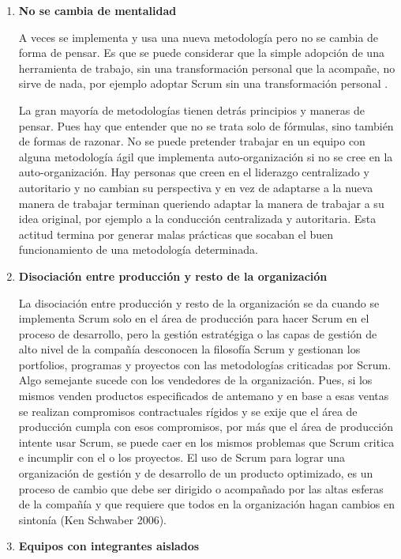 \begin{enumerate}
\item \textbf{No se cambia de mentalidad}

A veces se implementa y usa una nueva metodología pero no se cambia de forma de pensar. Es que se puede considerar que la simple adopción de una herramienta de trabajo, sin una transformación personal que la acompañe, no sirve de nada, por ejemplo adoptar Scrum sin una transformación personal \cite{Martin-Alaimo-Kleer-2014}. 

La gran mayoría de metodologías tienen detrás principios y maneras de pensar. Pues hay que entender que no se trata solo de fórmulas, sino también de formas de razonar. No se puede pretender trabajar en un equipo con alguna metodología ágil que implementa auto-organización si no se cree en la auto-organización. Hay personas que creen en el liderazgo centralizado y autoritario y no cambian su perspectiva y en vez de adaptarse a la nueva manera de trabajar terminan queriendo adaptar la manera de trabajar a su idea original, por ejemplo a la conducción centralizada y autoritaria. Esta actitud termina por generar malas prácticas que socaban el buen funcionamiento de una metodología determinada.

\item \textbf{Disociación entre producción y resto de la organización}

La disociación entre producción y resto de la organización se da cuando se implementa Scrum solo en el área de producción para hacer Scrum en el proceso de desarrollo, pero la gestión estratégiga o las capas de gestión de alto nivel de la compañía desconocen la filosofía Scrum y gestionan los portfolios, programas y proyectos con las metodologías criticadas por Scrum. Algo semejante sucede con los vendedores de la organización. Pues, si los mismos venden productos especificados de antemano y en base a esas ventas se realizan compromisos contractuales rígidos y se exije que el área de producción cumpla con esos compromisos, por más que el área de producción intente usar Scrum, se puede caer en los mismos problemas que Scrum critica e incumplir con el o los proyectos. El uso de Scrum para lograr una organización de gestión y de desarrollo de un producto optimizado, es un proceso de cambio que debe ser dirigido o acompañado por las altas esferas de la compañía y que requiere que todos en la organización hagan cambios en sintonía (Ken Schwaber 2006).

\item \textbf{Equipos con integrantes aislados}


\end{enumerate}
